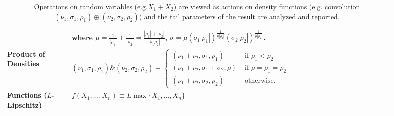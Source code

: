 \documentclass[../thesis.tex]{subfiles}
\begin{document}
\begin{table}[t]
{\begin{tabular}{|M{0.15\linewidth} | p{0.75\linewidth}|}
                                                           & where $\mu=\frac{1}{|\rho_{1}|}+\frac{1}{|\rho_{2}|}=\frac{|\rho_{1}|+|\rho_{2}|}{|\rho_{1}\rho_{2}|}$, $\sigma=\mu(\sigma_{1}|\rho_{1}|)^{\frac{1}{\mu|\rho_{1}|}}(\sigma_{2}|\rho_{2}|)^{\frac{1}{\mu|\rho_{2}|}}$. \\ \hline
      \centering \textbf{Product of Densities}             & $(\nu_1,\sigma_1,\rho_1)\&(\nu_2,\sigma_2,\rho_2)
      \equiv \begin{cases}
                 (\nu_{1}+\nu_{2},\sigma_{1},\rho_{1})        & \text{ if }\rho_{1}<\rho_{2}      \\
                 (\nu_{1}+\nu_{2},\sigma_{1}+\sigma_{2},\rho) & \text{ if }\rho=\rho_{1}=\rho_{2} \\
                 (\nu_{1}+\nu_{2},\sigma_{2},\rho_{2})        & \text{ otherwise.}
               \end{cases}$                                                                                                                                                                                      \\ \hline
      \centering \textbf{Functions ($L$-Lipschitz)}        &
      $f(X_1,\dots,X_n) \equiv L \max\{X_1,\dots,X_n\}$                                                                                                                                                                                                                            \\ \hline
    \end{tabular}
  }
  \vspace{.25cm}
  \caption{\label{tab:gga_operations}Operations on random variables (e.g.$X_1 + X_2$) are
    viewed as actions on density functions
    (e.g. convolution $(\nu_1, \sigma_1, \rho_1)\oplus (\nu_2, \sigma_2, \rho_2)$) and the tail parameters of the result are analyzed and reported.}
  \egroup
\end{table}
\end{document}
